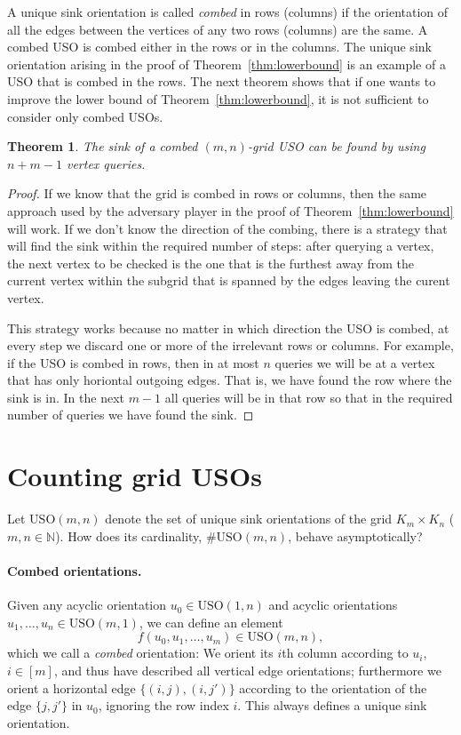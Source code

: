 \documentclass[a4paper,10pt]{article}
\newtheorem{theorem}{Theorem}
\newcommand{\USO}{\ensuremath{\mathrm{USO}}}
\begin{document}
A unique sink orientation is called \emph{combed} in rows (columns) if the orientation of all the edges between the vertices of any two rows (columns) are the same. 
A combed USO is combed either in the rows or in the columns. The unique sink orientation arising in the proof of Theorem~\ref{thm:lowerbound} is an example of a USO that is combed in the rows. 
The next theorem shows that if one wants to improve the lower bound of Theorem~\ref{thm:lowerbound}, it is not sufficient to consider only combed USOs.

\begin{theorem}
 The sink of a combed $(m,n)$-grid USO can be found by using $n+m-1$ vertex queries.
\end{theorem}

\begin{proof}
 If we know that the grid is combed in rows or columns, then the same approach used by the adversary player in the proof of Theorem~\ref{thm:lowerbound} will work. 
 If we don't know the direction of the combing, there is a strategy that will find the sink within the required number of steps: after querying a vertex, the next vertex to be checked is the one that is the furthest away from the current vertex within the subgrid that is spanned by the edges leaving the curent vertex. 
 
 This strategy works because no matter in which direction the USO is combed, at every step we discard  one or more of the irrelevant rows or columns. For example, if the USO is combed in rows, then in at most $n$ queries we will be at a vertex that has only horiontal outgoing edges. That is, we have found the row where the sink is in. In the next $m-1$ all queries will be in that row so that in the required number of queries we have found the sink.
\end{proof}

\section{Counting grid USOs}
\label{section:counting_unique_sink_orientations}


Let $\USO(m,n)$ denote the set of unique sink orientations of the grid
$K_m \times K_n$ ($m,n \in \mathbb{N}$).
How does its cardinality, $\#\USO(m,n)$, behave asymptotically?

\paragraph{Combed orientations.}
Given any acyclic orientation $u_0 \in \USO(1,n)$ and acyclic orientations
$u_1,\dots,u_n \in \USO(m,1)$, we can define an element
\[ f(u_0,u_1,\dots,u_m) \in \USO(m,n), \]
which we call a \emph{combed} orientation:
We orient its $i$th column according to $u_i$, $i \in [m]$, and thus have
described all vertical edge orientations; furthermore we orient a horizontal
edge $\{ (i,j), (i,j') \}$ according to the orientation of the edge
$\{ j,j' \}$ in $u_0$, ignoring the row index $i$.
This always defines a unique sink orientation.
\end{document}
